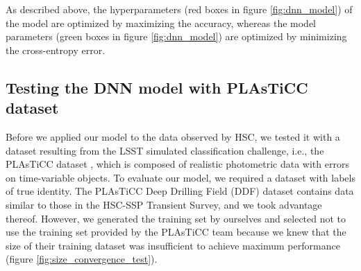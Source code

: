 \documentclass[useamsfonts]{pasj01}
\begin{document}
As described above, the hyperparameters (red boxes in figure \ref{fig:dnn_model}) of the model are optimized by maximizing the accuracy, whereas 
the model parameters (green boxes in figure \ref{fig:dnn_model}) are optimized by minimizing the cross-entropy error.
%
%

\subsection{Testing the DNN model with PLAsTiCC dataset} 
\label{sec:p}
%
Before we applied our model to the data observed by HSC, we tested it with a dataset resulting from the LSST simulated classification challenge, i.e., the PLAsTiCC dataset \citep{allam18a,malz19a}, which is composed of realistic photometric data with errors on time-variable objects.
To evaluate our model, we required a dataset with labels of true identity. 
The PLAsTiCC Deep Drilling Field (DDF) dataset contains data similar to those in the HSC-SSP Transient Survey, and we took advantage thereof.
However, we generated the training set by ourselves and selected not to use the training set provided by the PLAsTiCC team because we knew that the size of their training dataset was insufficient to achieve maximum performance (figure \ref{fig:size_convergence_test}).
\end{document}
